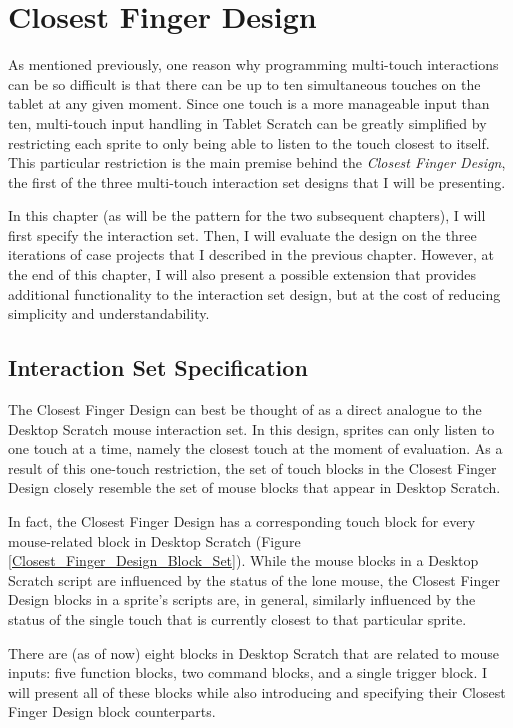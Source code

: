 \chapter{Closest Finger Design}

As mentioned previously, one reason why programming multi-touch interactions can be so difficult is that there can be up to ten simultaneous touches on the tablet at any given moment. Since one touch is a more manageable input than ten, multi-touch input handling in Tablet Scratch can be greatly simplified by restricting each sprite to only being able to listen to the touch closest to itself. This particular restriction is the main premise behind the \emph{Closest Finger Design}, the first of the three multi-touch interaction set designs that I will be presenting.

In this chapter (as will be the pattern for the two subsequent chapters), I will first specify the interaction set. Then, I will evaluate the design on the three iterations of case projects that I described in the previous chapter. However, at the end of this chapter, I will also present a possible extension that provides additional functionality to the interaction set design, but at the cost of reducing simplicity and understandability.

\section{Interaction Set Specification}

The Closest Finger Design can best be thought of as a direct analogue to the Desktop Scratch mouse interaction set. In this design, sprites can only listen to one touch at a time, namely the closest touch at the moment of evaluation. As a result of this one-touch restriction, the set of touch blocks in the Closest Finger Design closely resemble the set of mouse blocks that appear in Desktop Scratch.

In fact, the Closest Finger Design has a corresponding touch block for every mouse-related block in Desktop Scratch (Figure \ref{Closest_Finger_Design_Block_Set}). While the mouse blocks in a Desktop Scratch script are influenced by the status of the lone mouse,  the Closest Finger Design blocks in a sprite's scripts are, in general, similarly influenced by the status of the single touch that is currently closest to that particular sprite. 

There are (as of now) eight blocks in Desktop Scratch that are related to mouse inputs: five function blocks, two command blocks, and a single trigger block. I will  present all of these blocks while also introducing and specifying their Closest Finger Design block counterparts.

